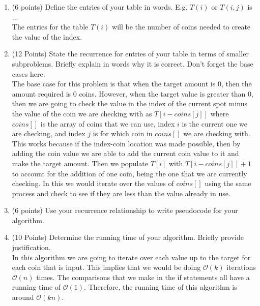 \documentclass{article}
\renewcommand{\O}{\mathcal{O}}
\newcounter{ProblemCounter}
\newenvironment{problem}[1][Problem]{
 \begin{trivlist}
 \item[\hskip \labelsep {\bfseries #1}\hskip \labelsep {%
 \bfseries \theProblemCounter.%
 \stepcounter{ProblemCounter}%
 }]
}{
 \end{trivlist}
}
\begin{document}
\begin{problem}
\begin{enumerate}[label=\textbf{\alph*.)}]
    \item (6 points) Define the entries of your table in words. E.g. $T(i)$ or $T(i, j)$ is ...\\
    The entries for the table $T(i)$ will be the number of coins needed to create the value of the index.
    \item (12 Points) State the recurrence for entries of your table in terms of smaller subproblems. Briefly explain in words why it is correct. Don't forget the base cases here.\\
    The base case for this problem is that when the target amount is 0, then the amount required is 0 coins. However, when the target value is greater than 0, then we are going to check the value in the index of the current spot minus the value of the coin we are checking with as $T[i-coins[j]]$ where $coins[]$ is the array of coins that we can use, index $i$ is the current one we are checking, and index $j$ is for which coin in $coins[]$ we are checking with. This works because if the index-coin location was made possible, then by adding the coin value we are able to add the current coin value to it and make the target amount. Then we populate $T[i]$ with $T[i-coins[j]] + 1$ to account for the addition of one coin, being the one that we are currently checking. In this we would iterate over the values of $coins[]$ using the same process and check to see if they are less than the value already in use.
    \item (6 points) Use your recurrence relationship to write pseudocode for your algorithm.\\
    \begin{algorithm}[H]
    \end{algorithm}
    \item (10 Points) Determine the running time of your algorithm. Briefly provide justification.\\
    In this algorithm we are going to iterate over each value up to the target for each coin that is input. This implies that we would be doing $\O(k)$ iterations $\O(n)$ times. The comparisons that we make in the if statements all have a running time of $\O(1)$. Therefore, the running time of this algorithm is around $\O(kn).$
\end{enumerate}
\end{problem}
\pagebreak
\end{document}

